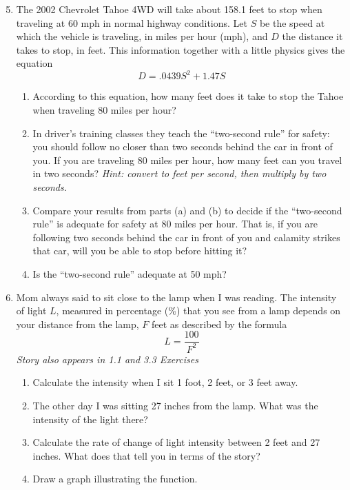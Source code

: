 \begin{enumerate} 
\setcounter{enumi}{4}

\item The 2002 Chevrolet Tahoe 4WD will take about 158.1 feet to stop when traveling at 60 mph in normal highway conditions.  Let $S$ be the speed at which the vehicle is traveling, in miles per hour (mph), and $D$ the distance it takes to stop, in feet.  This information together with a little physics gives the equation $$D = .0439S^2 + 1.47S$$
\begin{enumerate}
\item According to this equation, how many feet does it take to stop the Tahoe when traveling 80 miles per hour?
\item In driver's training classes they teach the ``two-second rule'' for safety:  you should follow no closer than two seconds behind the car in front of you.  If you are traveling 80 miles per hour, how many feet can you travel in two seconds?  \emph{Hint: convert to feet per second, then multiply by two seconds.}
\item Compare your results from parts (a) and (b) to decide if the ``two-second rule'' is adequate for safety at 80 miles per hour.  That is, if you are following two seconds behind the car in front of you and calamity strikes that car, will you be able to stop before hitting it?
\item Is the ``two-second rule'' adequate at 50 mph?
\end{enumerate}

\item Mom always said to sit close to the lamp when I was reading.  The intensity of light $L$, measured in percentage (\%) that you see from a lamp depends on your distance from the lamp, $F$ feet as described by the formula $$L=\frac{100}{F^2}$$
 \hfill \emph{Story also appears in 1.1 and 3.3 Exercises}
\begin{enumerate}
\item Calculate the  intensity when I sit 1 foot, 2 feet, or 3 feet away.
\item The other day I was sitting 27 inches from the lamp. What was the intensity of the light there? 
\item Calculate the rate of change of light intensity between 2 feet and 27 inches.  What does that tell you in terms of the story?
\item Draw a graph illustrating the function.
\end{enumerate}


\end{enumerate}

